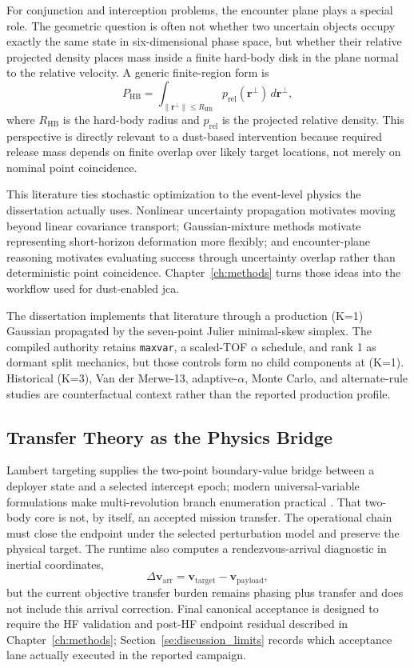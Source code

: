 For conjunction and interception problems, the encounter plane plays a special role. The geometric question is often not whether two uncertain objects occupy exactly the same state in six-dimensional phase space, but whether their relative projected density places mass inside a finite hard-body disk in the plane normal to the relative velocity. A generic finite-region form is
\begin{equation}
    P_{\mathrm{HB}} = \int_{\|\mathbf{r}^{\perp}\|\le R_{\mathrm{HB}}}
        p_{\mathrm{rel}}(\mathbf{r}^{\perp})\,d\mathbf{r}^{\perp},
\end{equation}
where \(R_{\mathrm{HB}}\) is the hard-body radius and \(p_{\mathrm{rel}}\) is the projected relative density. This perspective is directly relevant to a dust-based intervention because required release mass depends on finite overlap over likely target locations, not merely on nominal point coincidence.

This literature ties stochastic optimization to the event-level physics the dissertation actually uses. Nonlinear uncertainty propagation motivates moving beyond linear covariance transport; Gaussian-mixture methods motivate representing short-horizon deformation more flexibly; and encounter-plane reasoning motivates evaluating success through uncertainty overlap rather than deterministic point coincidence. Chapter~\ref{ch:methods} turns those ideas into the workflow used for dust-enabled \gls{jca}.

The dissertation implements that literature through a production (K=1) Gaussian propagated by the seven-point Julier minimal-skew simplex. The compiled authority retains \texttt{maxvar}, a scaled-TOF \(\alpha\) schedule, and rank 1 as dormant split mechanics, but those controls form no child components at (K=1). Historical (K=3), Van der Merwe-13, adaptive-\(\alpha\), Monte Carlo, and alternate-rule studies are counterfactual context rather than the reported production profile.

\subsection{Transfer Theory as the Physics Bridge}
Lambert targeting supplies the two-point boundary-value bridge between a deployer state and a selected intercept epoch; modern universal-variable formulations make multi-revolution branch enumeration practical \cite{izzo2014,battin1999}. That two-body core is not, by itself, an accepted mission transfer. The operational chain must close the endpoint under the selected perturbation model and preserve the physical target. The runtime also computes a rendezvous-arrival diagnostic in inertial coordinates,
\[
    \Delta\mathbf{v}_{\mathrm{arr}}
    = \mathbf{v}_{\mathrm{target}}-\mathbf{v}_{\mathrm{payload}},
\]
but the current objective transfer burden remains phasing plus transfer and does not include this arrival correction. Final canonical acceptance is designed to require the HF validation and post-HF endpoint residual described in Chapter~\ref{ch:methods}; Section~\ref{se:discussion_limits} records which acceptance lane actually executed in the reported campaign.

